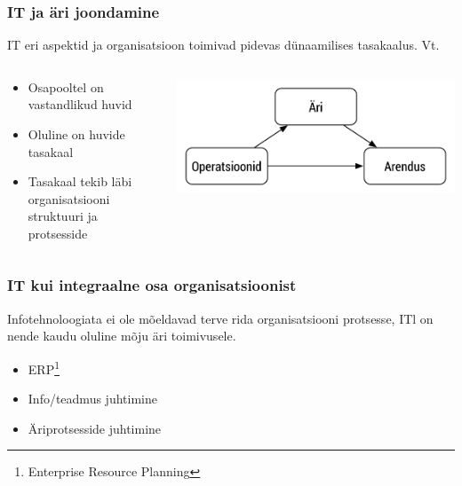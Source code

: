 \begin{frame}[fragile]
  \frametitle{IT ja äri joondamine}
  IT eri aspektid ja organisatsioon toimivad pidevas dünaamilises tasakaalus. Vt. \cite{luftman2004assessing}
	\begin{columns}[t]
		\begin{column}{6cm}
			\begin{itemize}
				\item Osapooltel on vastandlikud huvid
				\item Oluline on huvide tasakaal
				\item Tasakaal tekib läbi organisatsiooni struktuuri ja protsesside
			\end{itemize}
		\end{column}
		\begin{column}[T]{5cm}
			\includegraphics[width=\textwidth]{alignment.pdf}
		\end{column}
	\end{columns}
\end{frame}

\begin{frame}[fragile]
  \frametitle{IT kui integraalne osa organisatsioonist}
  Infotehnoloogiata ei ole mõeldavad terve rida organisatsiooni protsesse, ITl on nende kaudu oluline mõju äri toimivusele.
	\begin{itemize}
		\item ERP\footnote{Enterprise Resource Planning}
		\item Info/teadmus juhtimine
		\item Äriprotsesside juhtimine
	\end{itemize}
\end{frame}

